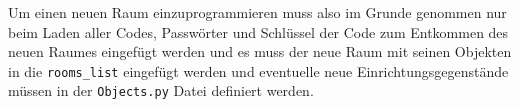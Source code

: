 Um einen neuen Raum einzuprogrammieren muss also im Grunde genommen nur beim Laden aller Codes, Passwörter und Schlüssel der Code zum Entkommen des neuen Raumes eingefügt werden und es muss der neue Raum mit seinen Objekten in die \verb+rooms_list+ eingefügt werden und eventuelle neue Einrichtungsgegenstände müssen in der \verb+Objects.py+ Datei definiert werden.